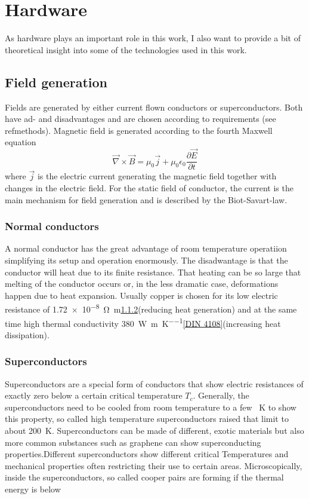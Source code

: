         \section{Hardware}
            As hardware plays an important role in this work, I also want to provide a bit of theoretical insight into some of the technologies used in this work.
            \subsection{Field generation}
                Fields are generated by either current flown conductors or superconductors. Both have ad- and disadvantages and are chosen according to requirements (see ref{methods}). Magnetic field is generated according to the fourth Maxwell equation
                \begin{equation}
                    \vec\nabla\times\vec B = \mu_0\vec j+\mu_0\epsilon_0\frac{\partial\vec E}{\partial t}
                \end{equation}
                where $\vec j$ is the electric current generating the magnetic field together with changes in the electric field. For the static field of conductor, the current is the main mechanism for field generation and is described by the Biot-Savart-law.
                \subsubsection{Normal conductors}
                A normal conductor has the great advantage of room temperature operatiion simplifying its setup and operation enormously. The disadwantage is that the conductor will heat due to its finite resistance. That heating can be so large that melting of the conductor occurs or, in the less dramatic case, deformations happen due to heat expansion. Usually copper is chosen for its low electric resistance of \SI{1.72e-8}{\ohm\meter}\ref{}(reducing heat generation) and at the same time high thermal conductivity \SI{380}{\watt\per\m\per\kelvin}\ref{DIN 4108}(increasing heat dissipation). 
                \subsubsection{Superconductors}
                Superconductors are a special form of conductors that show electric resistances of exactly zero below a certain critical temperature $T_c$. Generally, the superconductors need to be cooled from room temperature to a few \SI{}{\kelvin} to show this property, so called high temperature superconductors raised that limit to about \SI{200}{\kelvin}. Superconductors can be made of different, exotic materials but also more common substances such as graphene can show superconducting properties.Different superconductors show different critical Temperatures and mechanical properties often restricting their use to certain areas. Microscopically, inside the superconductors, so called cooper pairs are forming if the thermal energy is below 
